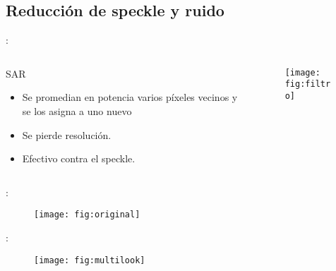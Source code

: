 \subsection{Reducción de speckle y ruido}
\begin{frame}{\secname : \subsecname}
  \begin{columns}[t]
    \begin{column}{0.5\textwidth}
     \begin{block}{SAR}
       \begin{itemize}
         \item Se promedian en potencia varios píxeles vecinos y se los asigna a uno nuevo
         \item Se pierde resolución.
         \item Efectivo contra el speckle.
       \end{itemize}
     \end{block}
    \end{column}
    \begin{column}{0.5\textwidth}  %
        \begin{figure}
          \centering
          \texttt{[image: fig:filtro]}
          \caption{}
          \label{}
        \end{figure}
    \end{column}
    \end{columns}
\end{frame}

\begin{frame}{\secname : \subsecname}
  \begin{figure}
    \centering
    \texttt{[image: fig:original]}
    \caption{ }
    \label{}
  \end{figure}
\end{frame}

\begin{frame}{\secname : \subsecname}
  \begin{figure}
    \centering
    \texttt{[image: fig:multilook]}
    \caption{ }
    \label{}
  \end{figure}
\end{frame}

